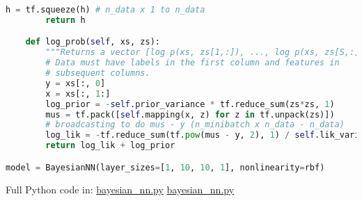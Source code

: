 \begin{lstlisting}[language=Python]
        h = tf.squeeze(h) # n_data x 1 to n_data
        return h

    def log_prob(self, xs, zs):
        """Returns a vector [log p(xs, zs[1,:]), ..., log p(xs, zs[S,:])]."""
        # Data must have labels in the first column and features in
        # subsequent columns.
        y = xs[:, 0]
        x = xs[:, 1:]
        log_prior = -self.prior_variance * tf.reduce_sum(zs*zs, 1)
        mus = tf.pack([self.mapping(x, z) for z in tf.unpack(zs)])
        # broadcasting to do mus - y (n_minibatch x n_data - n_data)
        log_lik = -tf.reduce_sum(tf.pow(mus - y, 2), 1) / self.lik_variance
        return log_lik + log_prior

model = BayesianNN(layer_sizes=[1, 10, 10, 1], nonlinearity=rbf)
\end{lstlisting}

Full Python code in:
\href{https://github.com/blei-lab/edward/blob/master/examples/bayesian_nn.py}
{bayesian_nn.py}
\href{https://github.com/blei-lab/edward/blob/master/examples/bayesian_nn_analytic_kl.py}
{bayesian_nn.py}

